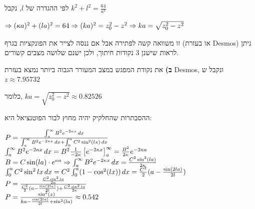 \documentclass[14pt]{extarticle}
\makeatletter
\newenvironment{lefteqs}{%
    \begin{english}%
    \begin{flushleft}%
    \renewcommand{\arraystretch}{1.3}%
    $\begin{array}{@{}l@{}}%
}{%
    \end{array}$%
    \end{flushleft}%
    \end{english}%
}
\makeatother
\begin{document}
לפי ההגדרה של $l$, נקבל $k^2+l^2 = \frac{64}{a^2}$

\begin{lefteqs}
    \Rightarrow (\kappa a)^2 + (la)^2 = 64 \Rightarrow (ka)^2 = z_0^2 - z^2 \Rightarrow ka=\sqrt{z_0^2 - z^2} \\
\end{lefteqs}

זו משוואה קשה לפתירה אבל אם ננסה לצייר את הפונקציות בגרף (או בעזרת Desmos) ניתן לראות שישנן 3 נקודות חיתוך, ולכן ישנם שלושה מצבים קשורים.

\textbf{ב)}
את נקודת המפגש במצב המעורר הגבוה ביותר נמצא בעזרת Desmos, ונקבל ש $z \approx 7.95732$

כלומר, $ka=\sqrt{z_0^2 - z^2} \approx 0.82526$

ההסבתרות שהחלקיק יהיה מחוץ לבור הפוטנציאל היא:
\begin{lefteqs}
    P = \frac{\int_{a}^{\infty} B^2 e^{-2\kappa x} \, dx}{\int_{a}^{\infty} B^2 e^{-2\kappa x} \, dx + \int_{0}^{a} C^2 \sin^2(lx) \, dx} \\
    \int_{a}^{\infty} B^2 e^{-2\kappa x} \, dx = B^2 \frac{1}{-2\kappa} \left[ e^{-2\kappa x} \right]_a^{\infty} = \frac{B^2}{2\kappa} e^{-2\kappa a} \\
    B=C\sin(la)\cdot e^{\kappa a} \Rightarrow \int_{a}^{\infty} B^2 e^{-2\kappa x} \, dx = \frac{C^2 \sin^2(la)}{2\kappa} \\
    \int_{0}^{a} C^2 \sin^2{lx} \, dx = C^2 \int_{0}^{a} (1 - \cos^2(lx)) \, dx = \frac{C^2}{2} (a - \frac{\sin(2la)}{2l}) \\
    P = \frac{\frac{C^2 \sin^2{la}}{2\kappa}}{\frac{C^2}{2}(a - \frac{\sin(2la)}{2l}) + \frac{C^2 \sin^2{la}}{2\kappa}} \\
    P = \frac{\sin^2(z)}{ka - \frac{\sin(2la)}{2l} + \sin^2(la)} \approx 0.542

\end{lefteqs}
\end{document}
